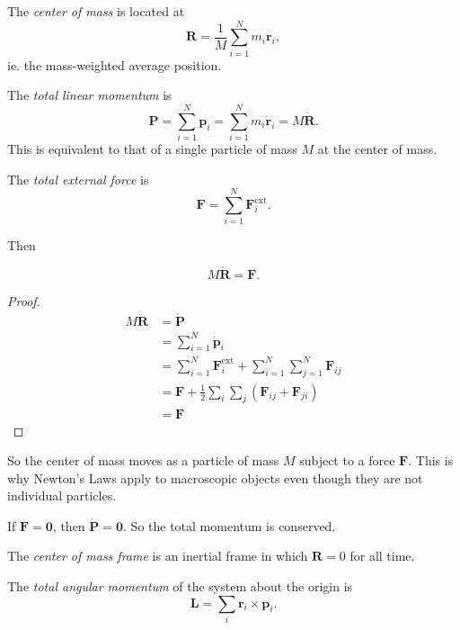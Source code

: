 \documentclass[a4paper]{article}
\begin{document}
\begin{defi}
  The \emph{center of mass} is located at
  \[
    \mathbf{R} = \frac{1}{M}\sum_{i = 1}^N m_i\mathbf{r}_i,
  \]
  ie. the mass-weighted average position.
\end{defi}

\begin{defi}
  The \emph{total linear momentum} is
  \[
    \mathbf{P} = \sum_{i = 1}^N \mathbf{p}_i = \sum_{i = 1}^N m_i \dot{\mathbf{r}}_i = M\dot{\mathbf{R}}.
  \]
  This is equivalent to that of a single particle of mass $M$ at the center of mass.
\end{defi}

\begin{defi}
  The \emph{total external force} is
  \[
    \mathbf{F} = \sum_{i = 1}^N \mathbf{F}_i^{\text{ext}}.
  \]
\end{defi}
Then
\begin{prop}
  \[
    M\ddot{\mathbf{R}} = \mathbf{F}.
  \]
\end{prop}

\begin{proof}
  \begin{align*}
    M\ddot{\mathbf{R}} &= \dot{\mathbf{P}}\\
    &= \sum_{i = 1}^N \dot{\mathbf{p}}_i\\
    &= \sum_{i = 1}^N \mathbf{F}_i^{\text{ext}} + \sum_{i = 1}^N\sum_{j = 1}^N \mathbf{F}_{ij}\\
    &= \mathbf{F} + \frac{1}{2}\sum_i \sum_j(\mathbf{F}_{ij} + \mathbf{F}_{ji})\\
    &= \mathbf{F}
  \end{align*}
\end{proof}
So the center of mass moves as a particle of mass $M$ subject to a force $\mathbf{F}$. This is why Newton's Laws apply to macroscopic objects even though they are not individual particles.

\begin{law}
  If $\mathbf{F} = \mathbf{0}$, then $\dot{\mathbf{P}} = \mathbf{0}$. So the total momentum is conserved.
\end{law}

\begin{defi}
  The \emph{center of mass frame} is an inertial frame in which $\mathbf{R} = 0$ for all time.
\end{defi}

\begin{defi}
  The \emph{total angular momentum} of the system about the origin is
  \[
    \mathbf{L} = \sum_i  \mathbf{r}_i \times \mathbf{p}_i.
  \]
\end{defi}
\end{document}
